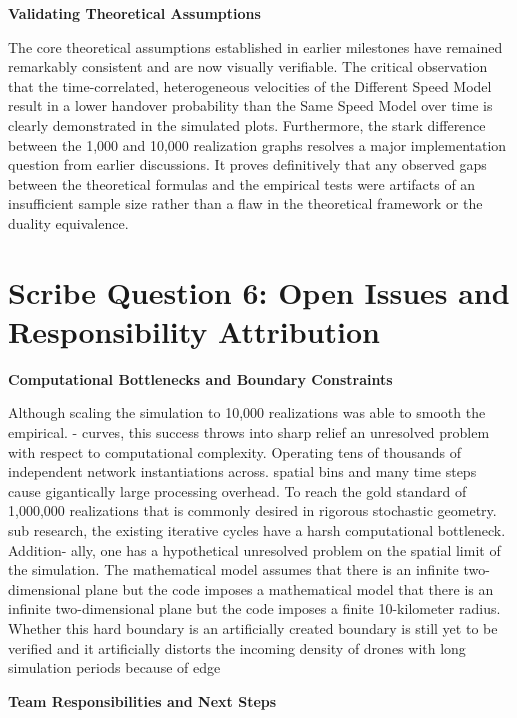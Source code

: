 \documentclass[12pt,a4paper]{article}
\begin{document}
\textbf{Validating Theoretical Assumptions}

The core theoretical assumptions established in earlier milestones have remained remarkably consistent and are now visually verifiable. The critical observation that the time-correlated, heterogeneous velocities of the Different Speed Model result in a lower handover probability than the Same Speed Model over time is clearly demonstrated in the simulated plots. Furthermore, the stark difference between the 1,000 and 10,000 realization graphs resolves a major implementation question from earlier discussions. It proves definitively that any observed gaps between the theoretical formulas and the empirical tests were artifacts of an insufficient sample size rather than a flaw in the theoretical framework or the duality equivalence.


\section*{Scribe Question 6: Open Issues and Responsibility Attribution}

\textbf{Computational Bottlenecks and Boundary Constraints}

Although scaling the simulation to 10,000 realizations was able to smooth the empirical. - curves, this success throws into sharp relief an unresolved problem with respect to computational complexity. Operating tens of thousands of independent network instantiations across. spatial bins and many time steps cause gigantically large processing overhead. To reach the gold standard of 1,000,000 realizations that is commonly desired in rigorous stochastic geometry. sub research, the existing iterative cycles have a harsh computational bottleneck. Addition- ally, one has a hypothetical unresolved problem on the spatial limit of the simulation. The mathematical model assumes that there is an infinite two-dimensional plane but the code imposes a mathematical model that there is an infinite two-dimensional plane but the code imposes a finite 10-kilometer radius. Whether this hard boundary is an artificially created boundary is still yet to be verified and it artificially distorts the incoming density of drones with long simulation periods because of edge 

\textbf{Team Responsibilities and Next Steps}
\end{document}

